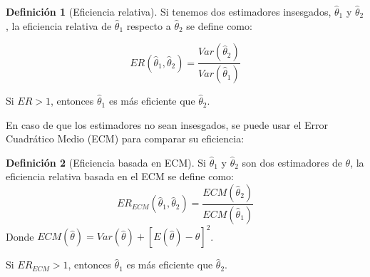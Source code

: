 \documentclass[
  11pt,
]{book}
\theoremstyle{definition}
\newtheorem{definition}{Definición}[chapter]
\theoremstyle{definition}
\theoremstyle{definition}
\theoremstyle{definition}
\theoremstyle{remark}
\begin{document}
\begin{definition}[Eficiencia relativa]
Si tenemos dos estimadores insesgados, \(\hat{\theta}_1\) y \(\hat{\theta}_2\), la eficiencia relativa de \(\hat{\theta}_1\) respecto a \(\hat{\theta}_2\) se define como:

\[ ER(\hat{\theta}_1, \hat{\theta}_2) = \frac{Var(\hat{\theta}_2)}{Var(\hat{\theta}_1)} \]

Si \(ER > 1\), entonces \(\hat{\theta}_1\) es más eficiente que \(\hat{\theta}_2\).
\end{definition}

En caso de que los estimadores no sean insesgados, se puede usar el Error Cuadrático Medio (ECM) para comparar su eficiencia:

\begin{definition}[Eficiencia basada en ECM]
Si \(\hat{\theta}_1\) y \(\hat{\theta}_2\) son dos estimadores de \(\theta\), la eficiencia relativa basada en el ECM se define como:
\[ ER_{ECM}(\hat{\theta}_1, \hat{\theta}_2) = \frac{ECM(\hat{\theta}_2)}{ECM(\hat{\theta}_1)} \]
Donde \(ECM(\hat{\theta}) = Var(\hat{\theta}) + [E(\hat{\theta}) - \theta]^2\).

Si \(ER_{ECM} > 1\), entonces \(\hat{\theta}_1\) es más eficiente que \(\hat{\theta}_2\).
\end{definition}
\end{document}
